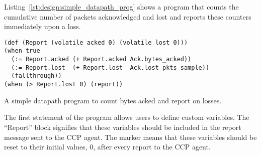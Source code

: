 Listing~\ref{lst:design:simple_datapath_prog} shows a program that counts the cumulative number of packets acknowledged and lost and reports these counters immediately upon a loss.
\begin{listing}
{\footnotesize
\begin{verbatim}
(def (Report (volatile acked 0) (volatile lost 0)))
(when true
  (:= Report.acked (+ Report.acked Ack.bytes_acked))
  (:= Report.lost  (+ Report.lost  Ack.lost_pkts_sample))
  (fallthrough))
(when (> Report.lost 0) (report))
\end{verbatim}
\caption{A simple datapath program to count bytes acked and report on losses.} \label{lst:design:simple_datapath_prog}
}
\end{listing}
The first statement of the program allows users to define custom variables.
The ``Report'' block signifies that these variables should be included in the report message sent to the CCP agent.
The  marker means that these variables should be reset to their initial values, 0, after every report to the CCP agent.

